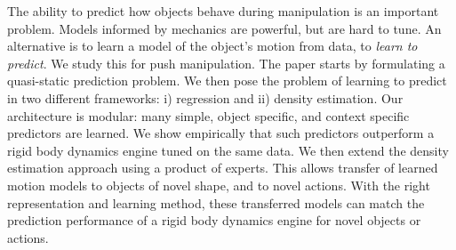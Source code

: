 The ability to predict how objects behave during manipulation is an important problem.  Models informed by mechanics are powerful, but are hard to tune.  An alternative is to learn a model of the object's motion from data, to {\em learn to predict}. We study this for push manipulation. The paper starts by formulating a quasi-static prediction problem. We then pose the problem of learning to predict in two different frameworks: i) regression and ii) density estimation. Our architecture is modular: many simple, object specific, and context specific predictors are learned. We show empirically that such predictors outperform a rigid body dynamics engine tuned on the same data.  We then extend the density estimation approach using a product of experts. This allows transfer of learned motion models to objects of novel shape, and to novel actions. With the right representation and learning method, these transferred models can match the prediction performance of a rigid body dynamics engine for novel objects or actions.